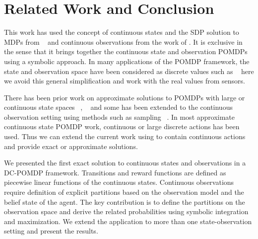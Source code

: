 \documentclass{article} %
\begin{document}
\section{Related Work and Conclusion} 
This work has used the concept of continuous states and the SDP solution to MDPs from ~\cite{sanner_uai11} and continuous observations from the work of \cite{pascalPomdp}. It is exclusive in the sense that it brings together the continuous state and observation POMDPs using a symbolic approach. 
In many applications of the POMDP framework, the state and observation space have been considered as discrete values such as ~\cite{steam2} here we avoid this general simplification and work with the real values from sensors.

There has been prior work on approximate solutions to POMDPs with large or continuous state spaces ~\cite{Thrun99h}, ~\cite{Perseus} and some has been extended to the continuous observation setting using methods such as sampling ~\cite{PerseusObs}.
In most approximate continuous state POMDP work, continuous or large discrete actions has been used. Thus we can extend the current work using \cite{zamaniAAAI} to contain continuous actions and provide exact or approximate solutions. 

We presented the first exact solution to continuous states and observations in a DC-POMDP framework. Transitions and reward functions are defined as piecewise linear functions of the continuous states. Continuous observations require definition of explicit partitions based on the observation model and the belief state of the agent. The key contribution is to define the partitions on the observation space and derive the related probabilities using symbolic integration and maximization. We extend the application to more than one state-observation setting and present the results.  
 


\end{document}
